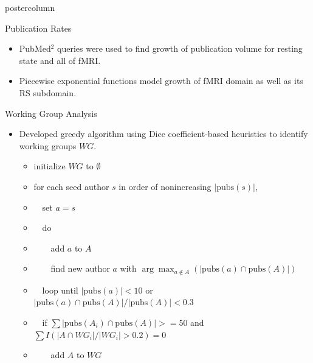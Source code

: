 \documentclass[final,hyperref={pdfpagelabels=false}]{beamer}
\begin{document}
\begin{frame}
\begin{columns}
\begin{column}{.5\textwidth}
\begin{beamercolorbox}[center,wd=\textwidth]{postercolumn}
\begin{minipage}[T]{.96\textwidth}
{\begin{block}{Publication Rates}
              \begin{itemize}
                  \item PubMed$^2$ queries were used to find growth of publication volume for resting state and all of fMRI. 
                  \item Piecewise exponential functions model growth of fMRI domain as well as its RS subdomain.
                   \end{itemize}
            \end{block}            
          \begin{block}{Working Group Analysis}
              \begin{itemize}
              \item Developed greedy algorithm using Dice coefficient-based heuristics to identify working groups $WG$.\\
              \begin{itemize}
			\item initialize $WG$ to $\emptyset$
			\item for each seed author $s$ in order of nonincreasing $|\text{pubs}(s)|$,
			\item \ \ set $a = s$
			\item \ \ do
			\item \ \ \ \ add $a$ to $A$
			\item \ \ \ \ find new author $a$ with $\arg \max_{a \notin A}(| \text{pubs}(a) \cap \text{pubs}(A)|)$
			\item \ \ loop until $|\text{pubs}(a)| < 10$ or $| \text{pubs}(a) \cap \text{pubs}(A)|/|\text{pubs}(A)| < 0.3$
			\item \ \ if $\sum | \text{pubs}(A_i) \cap \text{pubs}(A)| >= 50$ and $\sum I(|A \cap WG_i|/|WG_i| > 0.2) = 0$
			\item \ \ \ \ add $A$ to $WG$
		  \end{itemize}
              \end{itemize}
              \end{block}
            
}
\end{minipage}
\end{beamercolorbox}
\end{column}
\end{columns}
\end{frame}
\end{document}
